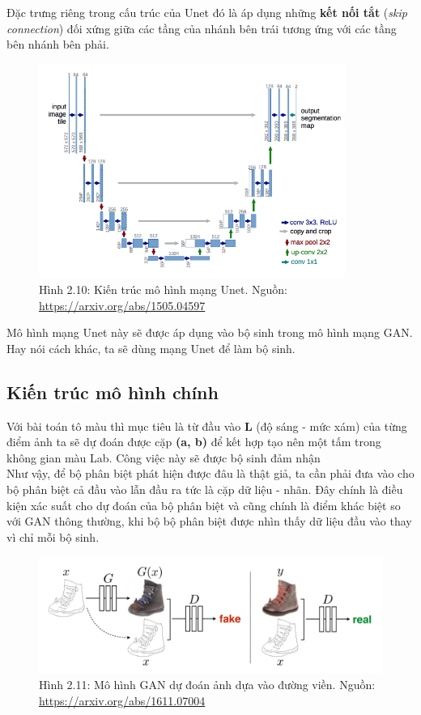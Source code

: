 \documentclass[a4paper]{article}
\begin{document}
\noindent
Đặc trưng riêng trong cấu trúc của Unet đó là áp dụng những \textbf{kết nối tắt} (\textit{skip connection}) đối xứng giữa các tầng của nhánh bên trái tương ứng với các tầng bên nhánh bên phải.
\begin{figure}[h!]
\centering
\includegraphics[width=10cm]{images/2_8.png}
\caption{Hình 2.10: Kiến trúc mô hình mạng Unet. Nguồn: \href{https://arxiv.org/abs/1505.04597}{https://arxiv.org/abs/1505.04597}}
\end{figure}

\noindent
Mô hình mạng Unet này sẽ được áp dụng vào bộ sinh trong mô hình mạng GAN. Hay nói cách khác, ta sẽ dùng mạng Unet để làm bộ sinh.

\subsection{Kiến trúc mô hình chính}
Với bài toán tô màu thì mục tiêu là từ đầu vào \textbf{L} (độ sáng - mức xám) của từng điểm ảnh ta sẽ dự đoán được cặp \textbf{(a, b)} để kết hợp tạo nên một tấm trong không gian màu Lab. Công việc này sẽ được bộ sinh đảm nhận\\
Như vậy, để bộ phân biệt phát hiện được đâu là thật giả, ta cần phải đưa vào cho bộ phân biệt cả đầu vào lẫn đầu ra tức là cặp dữ liệu - nhãn. Đây chính là điều kiện xác suất cho dự đoán của bộ phân biệt và cũng chính là điểm khác biệt so với GAN thông thường, khi bộ bộ phân biệt được nhìn thấy dữ liệu đầu vào thay vì chỉ mỗi bộ sinh.

\begin{figure}[h!]
\centering
\includegraphics[width=13cm]{images/2_9.PNG}
\caption{Hình 2.11: Mô hình GAN dự đoán ảnh dựa vào đường viền. Nguồn: \href{https://arxiv.org/abs/1611.07004}{https://arxiv.org/abs/1611.07004}}
\end{figure}
\end{document}
